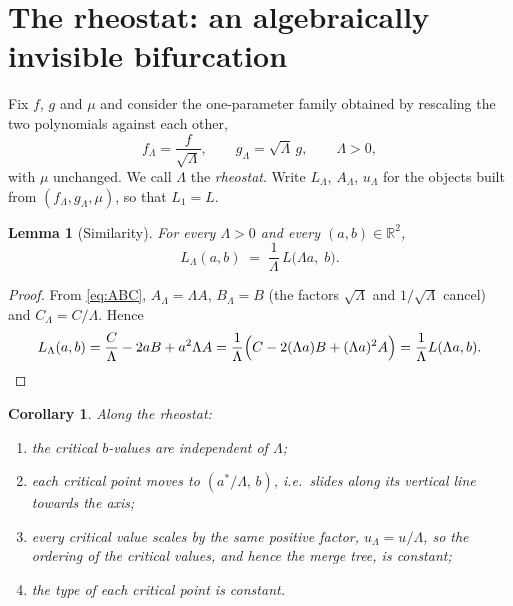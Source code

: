 \documentclass[11pt]{article}
\theoremstyle{plain}
\newtheorem{lemma}[theorem]{Lemma}
\newtheorem{corollary}[theorem]{Corollary}
\theoremstyle{definition}
\theoremstyle{remark}
\newcommand{\R}{\mathbb{R}}
\begin{document}
\section{The rheostat: an algebraically invisible bifurcation}\label{sec:rheostat}

Fix $f$, $g$ and $\mu$ and consider the one-parameter family obtained by
rescaling the two polynomials against each other,
\begin{equation}\label{eq:rheostat}
  f_\Lambda = \frac{f}{\sqrt\Lambda}, \qquad
  g_\Lambda = \sqrt\Lambda\, g, \qquad \Lambda > 0,
\end{equation}
with $\mu$ unchanged. We call $\Lambda$ the \emph{rheostat}. Write
$L_\Lambda$, $A_\Lambda$, $u_\Lambda$ for the objects built from
$(f_\Lambda, g_\Lambda, \mu)$, so that $L_1 = L$.

\begin{lemma}[Similarity]\label{lem:similarity}
For every $\Lambda > 0$ and every $(a,b) \in \R^2$,
\begin{equation}\label{eq:similarity}
  L_\Lambda(a, b) \;=\; \frac{1}{\Lambda}\, L\bigl(\Lambda a,\; b\bigr).
\end{equation}
\end{lemma}

\begin{proof}
From \eqref{eq:ABC}, $A_\Lambda = \Lambda A$, $B_\Lambda = B$ (the factors
$\sqrt\Lambda$ and $1/\sqrt\Lambda$ cancel) and $C_\Lambda = C/\Lambda$. Hence
\[
  L_\Lambda(a,b) = \frac{C}{\Lambda} - 2aB + a^2 \Lambda A
  = \frac{1}{\Lambda}\Bigl( C - 2(\Lambda a)B + (\Lambda a)^2 A \Bigr)
  = \frac{1}{\Lambda} L(\Lambda a, b). \qedhere
\]
\end{proof}

\begin{corollary}\label{cor:invariants}
Along the rheostat:
\begin{enumerate}
\item[(i)] the critical $b$-values are independent of $\Lambda$;
\item[(ii)] each critical point moves to $(a^*/\Lambda,\, b)$, i.e.\ slides
  along its vertical line towards the axis;
\item[(iii)] every critical value scales by the same positive factor,
  $u_\Lambda = u/\Lambda$, so the \emph{ordering} of the critical values, and
  hence the merge tree, is constant;
\item[(iv)] the type of each critical point is constant.
\end{enumerate}
\end{corollary}
\end{document}
